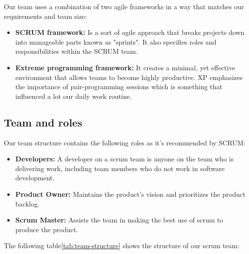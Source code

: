 Our team uses a combination of two agile frameworks in a way that matches our requirements and team size: 

\begin{itemize}[label=\textbullet]
\item \textbf{SCRUM framework: } Is a sort of agile approach that breaks projects down into manageable parts known as "sprints". It also specifies roles and responsibilities within the SCRUM team. 

\item \textbf{Extreme programming framework: } It creates a minimal, yet effective environment that allows teams to become highly productive. XP emphasizes the importance of pair-programming sessions which is something that influenced a lot our daily work routine.  
\end{itemize}


\subsection{Team and roles }

Our team structure contains the following roles as it's recommended by SCRUM:

\begin{itemize}[label=\textbullet]
    \item \textbf{Developers:} A developer on a scrum team is anyone on the team who is delivering work, including team members who do not work in software development.
    \item \textbf{Product Owner:} Maintains the product's vision and prioritizes the product backlog.
    \item \textbf{Scrum Master:} Assists the team in making the best use of scrum to produce the product.
\end{itemize} 



The following table\ref{tab:team-structure} shows the structure of our scrum team:

